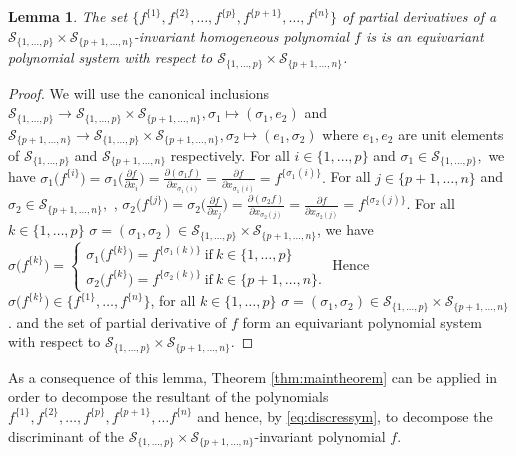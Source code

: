 \documentclass[12pt,a4paper,reqno]{amsart}
\newtheorem{lemma}[theorem]{Lemma}
\theoremstyle{definition}
\theoremstyle{remark}
\numberwithin{equation}{section}
\begin{document}
\begin{lemma}
The set $\{ f^{\{1\}},f^{\{2\}},\ldots,f^{\{p\}},f^{\{p+1\}},\ldots,f^{\{n\}} \}$ of partial derivatives of a  $\mathcal{S}_{\{1,\ldots,p\}}\times\mathcal{S}_{\{p+1,\ldots,n\}} $-invariant homogeneous polynomial $f$ is is an equivariant polynomial system with respect to $\mathcal{S}_{\{1,\ldots,p\}}\times\mathcal{S}_{\{p+1,\ldots,n\}} $.
\end{lemma}
\begin{proof}
We will use the canonical inclusions  $ \mathcal{S}_{\{1,\ldots,p\}} \to \mathcal{S}_{\{1,\ldots,p\}}\times\mathcal{S}_{\{p+1,\ldots,n\}}, \sigma_1 \mapsto (\sigma_1, e_2)$ and  $ \mathcal{S}_{\{p+1,\ldots,n\}} \to \mathcal{S}_{\{1,\ldots,p\}}\times\mathcal{S}_{\{p+1,\ldots,n\}}, \sigma_2 \mapsto (e_1,\sigma_2)$ where $e_1, e_2$ are unit elements of $ \mathcal{S}_{\{1,\ldots,p\}}$ and $\mathcal{S}_{\{p+1,\ldots,n\}}$ respectively.
For all $i\in \{1,\ldots,p\}$ and $\sigma_1 \in \mathcal{S}_{\{1,\ldots,p\}},$ we have $\sigma_1\Big(f^{\{i\}}\Big)=\sigma_1\Big(\frac{\partial f}{\partial x_{i}}\Big)=\frac{\partial (\sigma_1f)}{\partial x_{\sigma_1(i)}}=\frac{\partial f}{\partial x_{\sigma_1(i)}} =f^{\{ {\sigma_1(i)} \}}.$ For all $j\in \{p+1,\ldots,n\}$ and $\sigma_2 \in \mathcal{S}_{\{p+1,\ldots,n\}},$ , $\sigma_2\Big(f^{\{j\}}\Big)=\sigma_2\Big(\frac{\partial f}{\partial x_{j}}\Big)=\frac{\partial (\sigma_2 f)}{\partial x_{\sigma_2(j)}}=\frac{\partial f}{\partial x_{\sigma_2(j)}} =f^{\{ {\sigma_2(j)} \}}.$ For all $k \in \{1,\ldots,p\}$ $\sigma= (\sigma_1, \sigma_2) \in \mathcal{S}_{\{1,\ldots,p\}}\times\mathcal{S}_{\{p+1,\ldots,n\}}$, we have $\sigma \Big( f^{\{k\}} \Big)= \begin{cases}
\sigma_1 \Big( f^{\{k\}} \Big)= f^{\{ {\sigma_1(k)} \}}\  \mbox{if}\  k\in \{1,\ldots,p\} \\
\sigma_2 \Big( f^{\{k\}} \Big)= f^{\{ {\sigma_2(k)} \}}\  \mbox{if}\  k\in \{p+1,\ldots,n\}.
\end{cases}$
Hence $\sigma \Big( f^{\{k\}} \Big) \in  \{ f^{\{1\}},\ldots ,f^{\{n\}} \}$, for all  $k \in \{1,\ldots,p\}$ $\sigma= (\sigma_1, \sigma_2) \in \mathcal{S}_{\{1,\ldots,p\}}\times\mathcal{S}_{\{p+1,\ldots,n\}}$. and the set of partial derivative of $f$ form  an equivariant polynomial system with respect to $\mathcal{S}_{\{1,\ldots,p\}}\times\mathcal{S}_{\{p+1,\ldots,n\}} $.
\end{proof}


As a consequence of this lemma, Theorem \ref{thm:maintheorem} can be applied in order to decompose the resultant of the polynomials $f^{\{1\}},f^{\{2\}},\ldots,f^{\{p\}},f^{\{p+1\}},\ldots f^{\{n\}}$ and hence, by \eqref{eq:discressym}, to decompose the discriminant of the $\mathcal{S}_{\{1,\ldots,p\}}\times\mathcal{S}_{\{p+1,\ldots,n\}} $-invariant polynomial $f$. %
\end{document}
